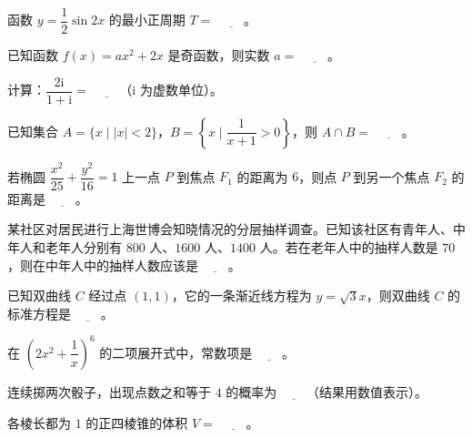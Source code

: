 \begin{question}
函数 $y=\dfrac12\sin 2x$ 的最小正周期 $T=$ $\underline{\qquad}$。

\end{question}
\begin{question}
已知函数 $f(x)=ax^2+2x$ 是奇函数，则实数 $a=$ $\underline{\qquad}$。

\end{question}
\begin{question}
计算：$\dfrac{2\mathrm i}{1+\mathrm i}=$ $\underline{\qquad}$（$\mathrm i$ 为虚数单位）。

\end{question}
\begin{question}
已知集合 $A=\{x\mid |x|<2\}$，$B=\left\{x\mid \dfrac{1}{x+1}>0\right\}$，则 $A\cap B=$ $\underline{\qquad}$。

\end{question}
\begin{question}
若椭圆 $\dfrac{x^2}{25}+\dfrac{y^2}{16}=1$ 上一点 $P$ 到焦点 $F_1$ 的距离为 $6$，则点 $P$ 到另一个焦点 $F_2$ 的距离是 $\underline{\qquad}$。

\end{question}
\begin{question}
某社区对居民进行上海世博会知晓情况的分层抽样调查。已知该社区有青年人、中年人和老年人分别有 $800$ 人、$1600$ 人、$1400$ 人。若在老年人中的抽样人数是 $70$，则在中年人中的抽样人数应该是 $\underline{\qquad}$。

\end{question}
\begin{question}
已知双曲线 $C$ 经过点 $(1,1)$，它的一条渐近线方程为 $y=\sqrt3x$，则双曲线 $C$ 的标准方程是 $\underline{\qquad}$。

\end{question}
\begin{question}
在 $\left(2x^2+\dfrac1x\right)^6$ 的二项展开式中，常数项是 $\underline{\qquad}$。

\end{question}
\begin{question}
连续掷两次骰子，出现点数之和等于 $4$ 的概率为 $\underline{\qquad}$（结果用数值表示）。

\end{question}
\begin{question}
各棱长都为 $1$ 的正四棱锥的体积 $V=$ $\underline{\qquad}$。

\end{question}
